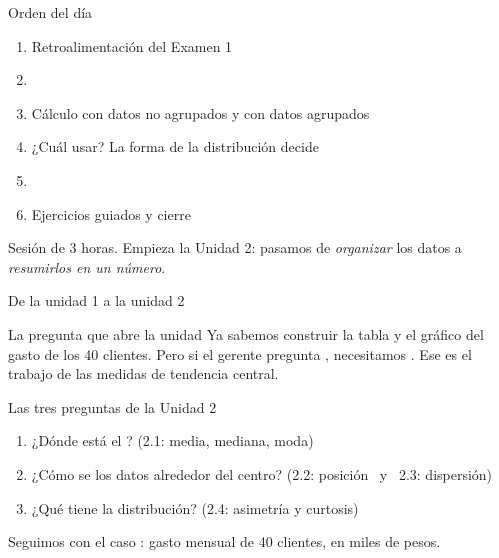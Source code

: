 \documentclass[aspectratio=169,10pt]{beamer}
\begin{document}
\portada

\begin{frame}{Orden del día}
  \begin{enumerate}
    \item Retroalimentación del Examen 1
    \item {}
    \item Cálculo con datos no agrupados y con datos agrupados
    \item ¿Cuál usar? La forma de la distribución decide
    \item {}
    \item Ejercicios guiados y cierre
  \end{enumerate}

  \vspace{0.25cm}
  {\footnotesize\color{uniGris} Sesión de 3 horas. Empieza la Unidad 2:
  pasamos de \emph{organizar} los datos a \emph{resumirlos en un número}.}
\end{frame}

\begin{frame}{De la unidad 1 a la unidad 2}
  \begin{alertblock}{La pregunta que abre la unidad}
    \footnotesize
    Ya sabemos construir la tabla y el gráfico del gasto de los 40 clientes.
    Pero si el gerente pregunta ,
    necesitamos . Ese es el trabajo de las medidas de
    tendencia central.
  \end{alertblock}

  \vspace{0.2cm}
  \begin{block}{Las tres preguntas de la Unidad 2}
    \footnotesize
    \begin{enumerate}
      \item ¿Dónde está el ? \quad (2.1: media, mediana, moda)
      \item ¿Cómo se  los datos alrededor del centro?
            \quad (2.2: posición \ y \ 2.3: dispersión)
      \item ¿Qué  tiene la distribución? \quad (2.4: asimetría y
            curtosis)
    \end{enumerate}
  \end{block}

  \vspace{0.15cm}
  {\footnotesize\color{uniGris} Seguimos con el caso :
  gasto mensual de 40 clientes, en miles de pesos.}
\end{frame}
\end{document}
